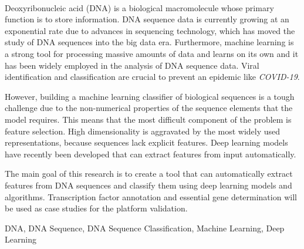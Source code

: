 {\large \textbf{\thetitle}}\\[1ex]
\noindent Deoxyribonucleic acid (DNA) is a biological macromolecule whose primary function is to store information. DNA sequence data is currently growing at an exponential rate due to advances in sequencing technology, which has moved the study of DNA sequences into the big data era. Furthermore, machine learning is a strong tool for processing massive amounts of data and learns on its own and it has been widely employed in the analysis of DNA sequence data. Viral identification and classification are crucial to prevent an epidemic like \emph{COVID-19}.

However, building a machine learning classifier of biological sequences is a tough challenge due to the non-numerical properties of the sequence elements that the model requires. This means that the most difficult component of the problem is feature selection. High dimensionality is aggravated by the most widely used representations, because sequences lack explicit features. Deep learning models have recently been developed that can extract features from input automatically.

The main goal of this research is to create a tool that can automatically extract features from DNA sequences and classify them using deep learning models and algorithms. Transcription factor annotation and essential gene determination will be used as case studies for the platform validation.

\begin{keywords}
DNA, DNA Sequence, DNA Sequence Classification, Machine Learning, Deep Learning
\end{keywords} 
